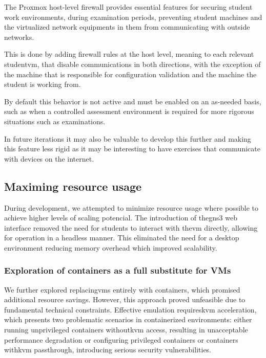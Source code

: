        The Proxmox host-level firewall provides essential features for securing student work environments, during examination 
        periods, preventing student machines and the virtualized network equipments in them from communicating with outside networks.

        This is done by adding firewall rules at the host level, meaning to each relevant student\ac{vm}, that disable communications
        in both directions, with the exception of the machine that is responsible for configuration validation and the machine the student is 
        working from.

        By default this behavior is not active and must be enabled on an as-needed basis, such as when a controlled assessment 
        environment is required for more rigorous situations such as examinations.

        In future iterations it may also be valuable to develop this further and making this feature less rigid as it may be interesting 
        to have exercises that communicate with devices on the internet.
    
    \subsection{Maximing resource usage}
        
        During development, we attempted to minimize resource usage where possible to achieve higher levels of scaling potencial. 
        The introduction of the\ac{gns3} web interface removed the need for students to interact with the\ac{vm} directly, allowing for 
        operation in a headless manner. This eliminated the need for a desktop environment reducing memory overhead which improved scalability.
        
        \subsubsection{Exploration of containers as a full substitute for VMs}

            We further explored replacing\ac{vm}s entirely with containers, which promised additional resource savings. However, this approach 
            proved unfeasible due to fundamental technical constraints. Effective emulation requires\ac{kvm} acceleration, which presents 
            two problematic scenarios in containerized environments: either running unprivileged containers without\ac{kvm} access, resulting 
            in unacceptable performance degradation or configuring privileged containers or containers with\ac{kvm} passthrough, introducing 
            serious security vulnerabilities.

